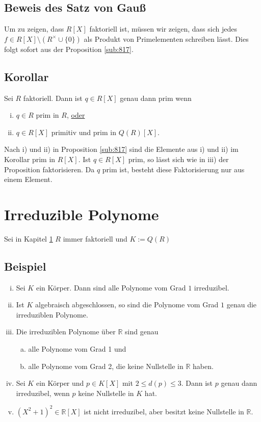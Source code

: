 \subsection{Beweis des Satz von Gauß} %
\label{sub:818}
Um zu zeigen, dass $R[X]$ faktoriell ist, müssen wir zeigen, dass sich jedes $f \in R[X] \setminus ( R^\times \cup \{0\})$ als Produkt von Primelementen schreiben lässt. Dies folgt sofort aus der Proposition \ref{sub:817}. \bewende

\subsection[{Korollar: Äquivalenz zu  \enquote{prim in $R[X]$}}]{Korollar} %
\label{sub:819}
Sei $R$ faktoriell. Dann ist $q \in R[X]$ genau dann prim wenn 
\begin{enumerate}[i)]
	\item $q \in R$ prim in $R$, \uline{oder}
	\item $q \in R[X]$ primitiv und prim in $Q(R)[X]$.
\end{enumerate}
Nach i) und ii) in Proposition \ref{sub:817} sind die Elemente aus i) und ii) im Korollar prim in $R[X]$. Ist $q \in R[X]$ prim, so lässt sich wie in iii) der Proposition
faktorisieren. Da $q$ prim ist, besteht diese Faktorisierung nur aus einem Element. \bewende
\newpage


\section{Irreduzible Polynome} %
\label{sec:9}
Sei in Kapitel \ref{sec:9} $R$ immer faktoriell und $K:= Q(R)$
\subsection[Beispiele für irreduzible Polynome]{Beispiel} %
\label{sub:91}
\begin{enumerate}[i)]
	\item Sei $K$ ein Körper. Dann sind alle Polynome vom Grad $1$ irreduzibel.
	\item Ist $K$ algebraisch abgeschlossen, so sind die Polynome vom Grad $1$ genau die irreduziblen Polynome.
	\item Die irreduziblen Polynome über $\mathds{R}$ sind genau
	\begin{enumerate}[a)]
		\item alle Polynome vom Grad 1 und
		\item alle Polynome vom Grad 2, die keine Nullstelle in $\mathds{R}$ haben.
	\end{enumerate}
	\item Sei $K$ ein Körper und $p \in K[X]$ mit $2 \le d(p) \le 3$. Dann ist $p$ genau dann irreduzibel, wenn $p$ keine Nullstelle in $K$ hat.
	\item $(X^2+1)^2 \in \mathds{R}[X]$ ist nicht irreduzibel, aber besitzt keine Nullstelle in $\mathds{R}$.
\end{enumerate}

